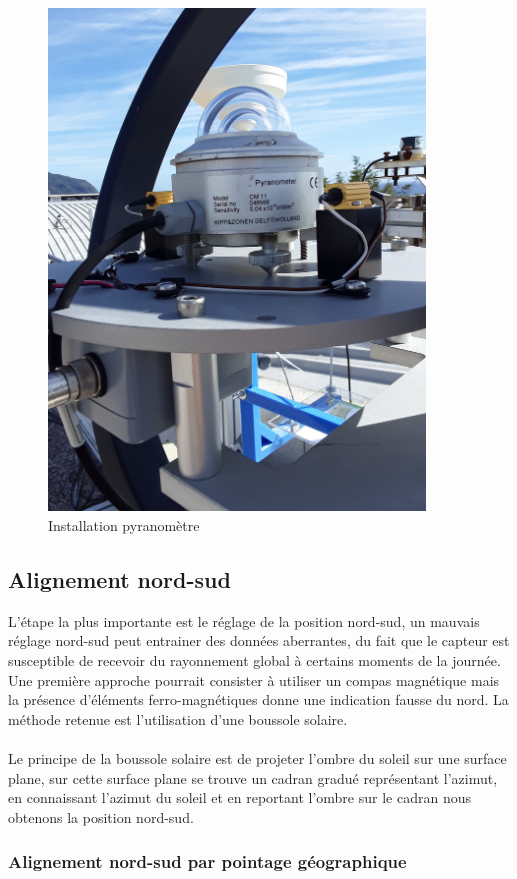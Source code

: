 \documentclass[12pt,a4paper]{article}
\begin{document}
\begin{flushleft}
\begin{figure}[H]
\centering
\includegraphics[width=10cm, angle=-90]{image/montage/4.jpg} 
\caption{Installation pyranomètre}
\end{figure}

\subsection{Alignement nord-sud}
L'étape la plus importante est le réglage de la position nord-sud, un mauvais réglage nord-sud peut entrainer des données aberrantes, du fait que le capteur est susceptible de recevoir du rayonnement global à certains moments de la journée. Une première approche pourrait consister à utiliser un compas magnétique mais la présence d'éléments ferro-magnétiques donne une indication fausse du nord. La méthode retenue est l'utilisation d'une boussole solaire.\\
~~\\
Le principe de la boussole solaire est de projeter l'ombre du soleil sur une surface plane, sur cette surface plane se trouve un cadran gradué représentant l'azimut, en connaissant l'azimut du soleil et en reportant l'ombre sur le cadran nous obtenons la position nord-sud.\\

\subsubsection{Alignement nord-sud par pointage géographique}


\end{flushleft}
\end{document}
